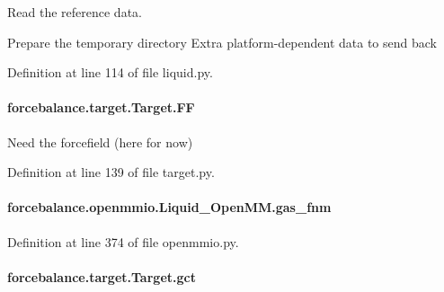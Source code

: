 Read the reference data. 

Prepare the temporary directory Extra platform-\/dependent data to send back 

Definition at line 114 of file liquid.\-py.

\hypertarget{classforcebalance_1_1target_1_1Target_a38a37919783141ea37fdcf8b00ce0aaf}{
\paragraph[{F\-F}]{\setlength{\rightskip}{0pt plus 5cm}forcebalance.\-target.\-Target.\-F\-F\hspace{0.3cm}{\ttfamily [inherited]}}}\label{classforcebalance_1_1target_1_1Target_a38a37919783141ea37fdcf8b00ce0aaf}


Need the forcefield (here for now) 



Definition at line 139 of file target.\-py.

\hypertarget{classforcebalance_1_1openmmio_1_1Liquid__OpenMM_a7b835f5dbacf1c31ead8c0c47e6895ce}{
\paragraph[{gas\-\_\-fnm}]{\setlength{\rightskip}{0pt plus 5cm}forcebalance.\-openmmio.\-Liquid\-\_\-\-Open\-M\-M.\-gas\-\_\-fnm}}\label{classforcebalance_1_1openmmio_1_1Liquid__OpenMM_a7b835f5dbacf1c31ead8c0c47e6895ce}


Definition at line 374 of file openmmio.\-py.

\hypertarget{classforcebalance_1_1target_1_1Target_aa625ac88c6744eb14ef281d9496d0dbb}{
\paragraph[{gct}]{\setlength{\rightskip}{0pt plus 5cm}forcebalance.\-target.\-Target.\-gct\hspace{0.3cm}{\ttfamily [inherited]}}}\label{classforcebalance_1_1target_1_1Target_aa625ac88c6744eb14ef281d9496d0dbb}


